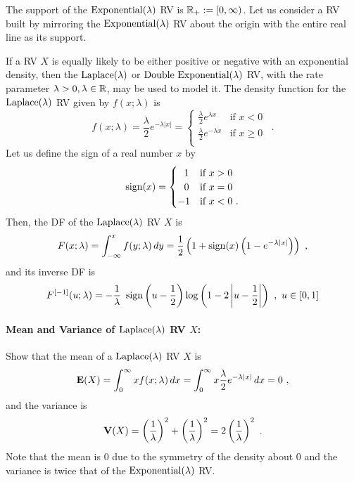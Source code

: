 The support of the $\mbox{{\rm Exponential}}(\lambda)$ RV is $\mathbb{R}_+ := [0,\infty)$.  Let us consider a RV built by mirroring the $\mbox{{\rm Exponential}}(\lambda)$ RV about the origin with the entire real line as its support.
\begin{model}
If a RV $X$ is equally likely to be either positive or negative with an exponential density, then the $\mbox{{\rm Laplace}}(\lambda)$ or $\mbox{{\rm Double~Exponential}}(\lambda)$ RV, with the rate parameter $\lambda>0, \lambda \in \mathbb{R}$, may be used to model it.  The density function for the $\mbox{{\rm Laplace}}(\lambda)$ RV given by $f(x; \lambda)$ is
\begin{equation}\label{E:Laplacepdf}
f(x; \lambda) = \frac{\lambda}{2} e^{- \lambda |x|} =
\begin{cases}
 \frac{\lambda}{2} e^{ \lambda x} & \text{if $x < 0$} \\
 \frac{\lambda}{2} e^{- \lambda x} & \text{if $x \geq 0$} \\
\end{cases}
\enspace .
\end{equation}
Let us define the sign of a real number $x$ by
\[
\operatorname{sign}(x) =
\begin{cases}
~~1 & \text{if $x > 0$} \\
~~0 & \text{if $x = 0$} \\
-1 & \text{if $x < 0$}  \ . \\
\end{cases}
\]
Then, the DF of the $\mbox{{\rm Laplace}}(\lambda)$ RV $X$ is
\begin{equation} \label{E:Laplacecdf}
F(x; \lambda) = \int_{-\infty}^{x} f(y; \lambda)\,dy = \frac{1}{2}\left(1+ \sign(x) \left(1-e^{- \lambda |x|}\right) \right) \ ,
\end{equation}
and its inverse DF is
\begin{equation}\label{E:LaplaceInvcdf}
F^{[-1]}(u;\lambda) = - \frac{1}{\lambda} \ \sign\left(u-\frac{1}{2}\right) \log \left(1 - 2 \left|u-\frac{1}{2} \right| \right) \ , \ u \in [0,1]
\end{equation}
\end{model}

\paragraph{Mean and Variance of $\mbox{{\rm Laplace}}(\lambda)$ RV $X$:}
Show that the mean of a $\mbox{{\rm Laplace}}(\lambda)$ RV $X$ is
\[
\mathbf{E}(X) = \int_{0}^{\infty} x f(x;\lambda)\,dx
=   \int_{0}^{\infty} x \frac{\lambda}{2} e^{- \lambda |x|}\,dx
= 0 \ ,
\]
and the variance is
\[
\mathbf{V}(X) = \left(  \frac{1}{\lambda} \right)^2 + \left(  \frac{1}{\lambda} \right)^2 = 2 \left(  \frac{1}{\lambda} \right)^2\ .
\]
Note that the mean is $0$ due to the symmetry of the density about $0$ and the variance is twice that of the $\mbox{{\rm Exponential}}(\lambda)$ RV.

